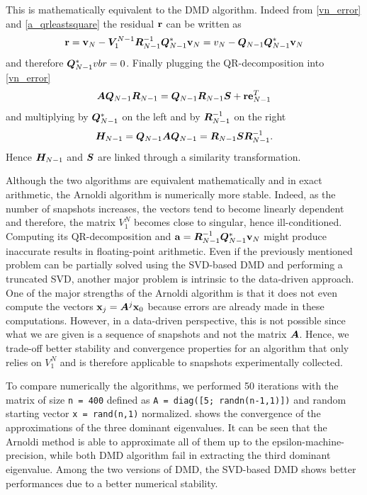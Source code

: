 This is mathematically equivalent to the DMD algorithm. Indeed from \eqref{vn_error} and \eqref{a_qrleastsquare} the residual $\vb{r}$ can be written as
\begin{equation*}
    \vb{r} = \vb{v}_N - \vb*{V}_1^{N-1}\vb*{R}_{N-1}^{-1}\vb*{Q}_{N-1}^*\vb{v}_N = v_N - \vb*{Q}_{N-1}\vb*{Q}_{N-1}^*\vb{v}_N
\end{equation*}
and therefore $\vb*{Q}_{N-1}^*vb{r} = 0$. Finally plugging the QR-decomposition into \eqref{vn_error}
\begin{equation*}
    \vb*{A}\vb*{Q}_{N-1}\vb*{R}_{N-1} = \vb*{Q}_{N-1}\vb*{R}_{N-1}\vb*{S} + \vb{r}\vb{e}_{N-1}^T
\end{equation*}
and multiplying by $\vb*{Q}_{N-1}^*$ on the left and by $\vb*{R}_{N-1}^{-1}$ on the right
\begin{equation}
    \label{similarity_arnoldi_dmd}
    \vb*{H}_{N-1} = \vb*{Q}_{N-1}\vb*{A}\vb*{Q}_{N-1} = \vb*{R}_{N-1}\vb*{S}\vb*{R}_{N-1}^{-1}.
\end{equation}
Hence $\vb*{H}_{N-1}$ and $\vb*{S}$ are linked through a similarity transformation.

Although the two algorithms are equivalent mathematically and in exact arithmetic, the Arnoldi algorithm is numerically more stable. Indeed, as the number of snapshots increases, the vectors tend to become linearly dependent and therefore, the matrix $V_1^N$ becomes close to singular, hence ill-conditioned. Computing its QR-decomposition and $\vb{a} = \vb*{R}_{N-1}^{-1} \vb*{Q}_{N-1}^*\vb{v}_N$ might produce inaccurate results in floating-point arithmetic. Even if the previously mentioned problem can be partially solved using the SVD-based DMD and performing a truncated SVD, another major problem is intrinsic to the data-driven approach. One of the major strengths of the Arnoldi algorithm is that it does not even compute the vectors $\vb{x}_j = \vb*{A}^j \vb{x}_0$ because errors are already made in these computations. However, in a data-driven perspective, this is not possible since what we are given is a sequence of snapshots and not the matrix $\vb*{A}$. Hence, we trade-off better stability and convergence properties for an algorithm that only relies on $V_1^N$ and is therefore applicable to snapshots experimentally collected.

To compare numerically the algorithms, we performed 50 iterations with the matrix of size \texttt{n = 400} defined as \texttt{A = diag([5; randn(n-1,1)])} and random starting vector \texttt{x = rand(n,1)} normalized.  shows the convergence of the approximations of the three dominant eigenvalues. It can be seen that the Arnoldi method is able to approximate all of them up to the epsilon-machine-precision, while both DMD algorithm fail in extracting the third dominant eigenvalue. Among the two versions of DMD, the SVD-based DMD shows better performances due to a better numerical stability.

